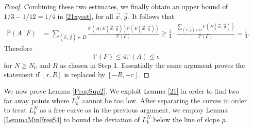 \begin{proof}
		Combining these two estimates, we finally obtain an upper bound of $1/3 - 1/12 = 1/4$ in \eqref{21xyest}, for all $\vec{x},\vec{y}$. It follows that
		\begin{align*}
		\mathbb{P}(A\,|\,F) &= \sum_{(\vec{x},\vec{y})\in D} \frac{\mathbb{P}(A\,|\,E(\vec{x},\vec{y}))\mathbb{P}(E(\vec{x},\vec{y}))}{\mathbb{P}(F)} \geq \frac{1}{4}\cdot\frac{\sum_{(\vec{x},\vec{y})\in D} \mathbb{P}(E(\vec{x},\vec{y}))}{\mathbb{P}(F)} = \frac{1}{4}.
		\end{align*}
		Therefore
		\[
		\mathbb{P}(F) \leq 4\mathbb{P}(A) \leq \epsilon
		\]
		for $N\geq N_0$ and $R$ as chosen in Step 1. Essentially the same argument proves the statement if $[r,R]$ is replaced by $[-R,-r]$.
		
	\end{proof}

	We now prove Lemma \ref{PropSup2}. We exploit Lemma \ref{21} in order to find two far away points where $L_k^N$ cannot be too low. After separating the curves in order to treat $L_k^N$ as a free curve as in the previous argument, we employ Lemma \ref{LemmaMinFreeS4} to bound the deviation of $L_k^N$ below the line of slope $p$.
	
